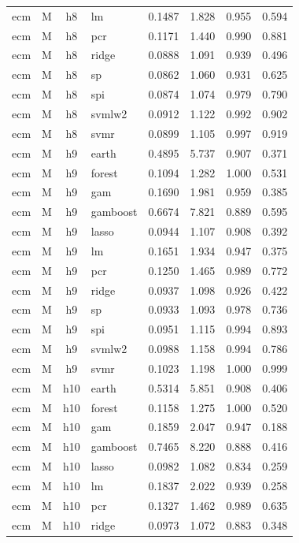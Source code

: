 \begin{ThreePartTable}
\begin{longtable}[t]{llclcccc}
ecm & M & h8 & lm & 0.1487 & 1.828 & 0.955 & 0.594\\
ecm & M & h8 & pcr & 0.1171 & 1.440 & 0.990 & 0.881\\
ecm & M & h8 & ridge & 0.0888 & 1.091 & 0.939 & 0.496\\
ecm & M & h8 & sp & 0.0862 & 1.060 & 0.931 & 0.625\\
ecm & M & h8 & spi & 0.0874 & 1.074 & 0.979 & 0.790\\
ecm & M & h8 & svmlw2 & 0.0912 & 1.122 & 0.992 & 0.902\\
ecm & M & h8 & svmr & 0.0899 & 1.105 & 0.997 & 0.919\\
\addlinespace
ecm & M & h9 & earth & 0.4895 & 5.737 & 0.907 & 0.371\\
ecm & M & h9 & forest & 0.1094 & 1.282 & 1.000 & 0.531\\
ecm & M & h9 & gam & 0.1690 & 1.981 & 0.959 & 0.385\\
ecm & M & h9 & gamboost & 0.6674 & 7.821 & 0.889 & 0.595\\
ecm & M & h9 & lasso & 0.0944 & 1.107 & 0.908 & 0.392\\
ecm & M & h9 & lm & 0.1651 & 1.934 & 0.947 & 0.375\\
ecm & M & h9 & pcr & 0.1250 & 1.465 & 0.989 & 0.772\\
ecm & M & h9 & ridge & 0.0937 & 1.098 & 0.926 & 0.422\\
ecm & M & h9 & sp & 0.0933 & 1.093 & 0.978 & 0.736\\
ecm & M & h9 & spi & 0.0951 & 1.115 & 0.994 & 0.893\\
ecm & M & h9 & svmlw2 & 0.0988 & 1.158 & 0.994 & 0.786\\
ecm & M & h9 & svmr & 0.1023 & 1.198 & 1.000 & 0.999\\
\addlinespace
ecm & M & h10 & earth & 0.5314 & 5.851 & 0.908 & 0.406\\
ecm & M & h10 & forest & 0.1158 & 1.275 & 1.000 & 0.520\\
ecm & M & h10 & gam & 0.1859 & 2.047 & 0.947 & 0.188\\
ecm & M & h10 & gamboost & 0.7465 & 8.220 & 0.888 & 0.416\\
ecm & M & h10 & lasso & 0.0982 & 1.082 & 0.834 & 0.259\\
ecm & M & h10 & lm & 0.1837 & 2.022 & 0.939 & 0.258\\
ecm & M & h10 & pcr & 0.1327 & 1.462 & 0.989 & 0.635\\
ecm & M & h10 & ridge & 0.0973 & 1.072 & 0.883 & 0.348\\

\end{longtable}
\end{ThreePartTable}
